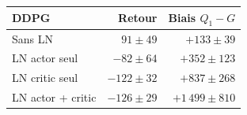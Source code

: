 \begin{tabular}{@{}lrr@{}}
\toprule
\textbf{DDPG} & \textbf{Retour} & \textbf{Biais $Q_1-G$} \\
\midrule
Sans LN & $91 \pm 49$ & $+133 \pm 39$ \\
LN actor seul & $-82 \pm 64$ & $+352 \pm 123$ \\
LN critic seul & $-122 \pm 32$ & $+837 \pm 268$ \\
LN actor + critic & $-126 \pm 29$ & $+1\,499 \pm 810$ \\
\bottomrule
\end{tabular}